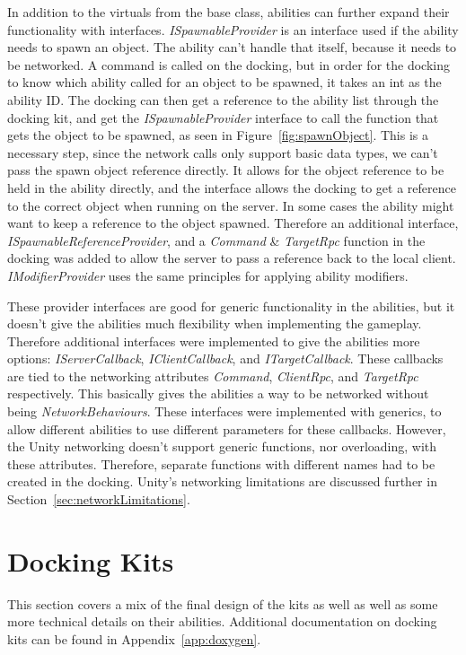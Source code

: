 In addition to the virtuals from the base class, abilities can further expand their functionality with interfaces. \emph{ISpawnableProvider} is an interface used if the ability needs to spawn an object. The ability can't handle that itself, because it needs to be networked. A command is called on the docking, but in order for the docking to know which ability called for an object to be spawned, it takes an int as the ability ID. The docking can then get a reference to the ability list through the docking kit, and get the \emph{ISpawnableProvider} interface to call the function that gets the object to be spawned, as seen in Figure~\ref{fig:spawnObject}. This is a necessary step, since the network calls only support basic data types, we can't pass the spawn object reference directly. It allows for the object reference to be held in the ability directly, and the interface allows the docking to get a reference to the correct object when running on the server. In some cases the ability might want to keep a reference to the object spawned. Therefore an additional interface, \emph{ISpawnableReferenceProvider}, and a \emph{Command} \& \emph{TargetRpc} function in the docking was added to allow the server to pass a reference back to the local client. \emph{IModifierProvider} uses the same principles for applying ability modifiers.

These provider interfaces are good for generic functionality in the abilities, but it doesn't give the abilities much flexibility when implementing the gameplay. Therefore additional interfaces were implemented to give the abilities more options: \emph{IServerCallback}, \emph{IClientCallback}, and \emph{ITargetCallback}. These callbacks are tied to the networking attributes \emph{Command}, \emph{ClientRpc}, and \emph{TargetRpc} respectively. This basically gives the abilities a way to be networked without being \emph{NetworkBehaviours}. These interfaces were implemented with generics, to allow different abilities to use different parameters for these callbacks. However, the Unity networking doesn't support generic functions, nor overloading, with these attributes. Therefore, separate functions with different names had to be created in the docking. Unity's networking limitations are discussed further in Section~\ref{sec:networkLimitations}.

\section{Docking Kits}
\label{sec:dockingKits}
This section covers a mix of the final design of the kits as well as well as some more technical details on their abilities. Additional documentation on docking kits can be found in Appendix~\ref{app:doxygen}.

